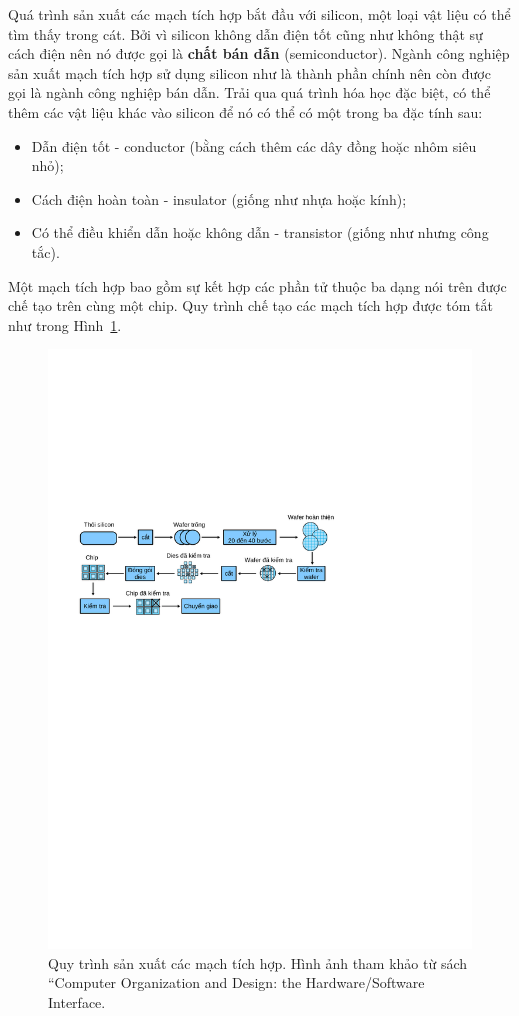 Quá trình sản xuất các mạch tích hợp bắt đầu với silicon, một loại vật liệu có thể tìm thấy trong cát. Bởi vì silicon không dẫn điện tốt cũng như không thật sự cách điện nên nó được gọi là \textbf{chất bán dẫn} (semiconductor). Ngành công nghiệp sản xuất mạch tích hợp sử dụng silicon như là thành phần chính nên còn được gọi là ngành công nghiệp bán dẫn. Trải qua quá trình hóa học đặc biệt, có thể thêm các vật liệu khác vào silicon để nó có thể có một trong ba đặc tính sau:
\begin{itemize}
\item Dẫn điện tốt - conductor (bằng cách thêm các dây đồng hoặc nhôm siêu nhỏ);
\item Cách điện hoàn toàn - insulator (giống như nhựa hoặc kính);
\item Có thể điều khiển dẫn hoặc không dẫn - transistor (giống như nhưng công tắc).
\end{itemize}
Một mạch tích hợp bao gồm sự kết hợp các phần tử thuộc ba dạng nói trên được chế tạo trên cùng một chip. Quy trình chế tạo các mạch tích hợp được tóm tắt như trong Hình~\ref{fig:IC_produce}.

\begin{figure}[!h]
	\centering
		\includegraphics[width=1.0\columnwidth]{chapter01/figure/IC_produce}
		\centering
	\caption{Quy trình sản xuất các mạch tích hợp. Hình ảnh tham khảo từ sách ``Computer Organization and Design: the Hardware/Software Interface.}
	\label{fig:IC_produce}
\end{figure}

